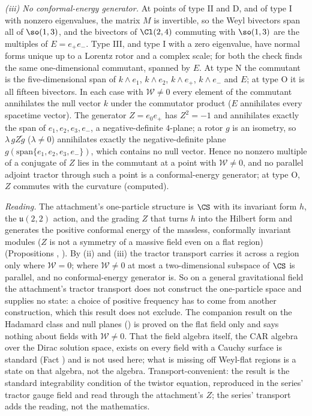 \emph{(iii) No conformal-energy generator.} At points of type II and D, and of type I with nonzero eigenvalues, the matrix $M$ is invertible, so the Weyl bivectors span all of $\so(1,3)$, and the bivectors of $\Cl(2,4)$ commuting with $\so(1,3)$ are the multiples of $E = e_{+}e_{-}$. Type III, and type I with a zero eigenvalue, have normal forms unique up to a Lorentz rotor and a complex scale; for both the check finds the same one-dimensional commutant, spanned by $E$. At type N the commutant is the five-dimensional span of $k\wedge e_{1}$, $k\wedge e_{2}$, $k\wedge e_{+}$, $k\wedge e_{-}$ and $E$; at type O it is all fifteen bivectors. In each case with $\mathcal{W} \neq 0$ every element of the commutant annihilates the null vector $k$ under the commutator product ($E$ annihilates every spacetime vector). The generator $Z = e_{0}e_{+}$ has $Z^{2} = -1$ and annihilates exactly the span of $e_{1}, e_{2}, e_{3}, e_{-}$, a negative-definite $4$-plane; a rotor $g$ is an isometry, so $\lambda\,gZ\tilde g$ ($\lambda \neq 0$) annihilates exactly the negative-definite plane $g(\mathrm{span}\{e_{1}, e_{2}, e_{3}, e_{-}\})$, which contains no null vector. Hence no nonzero multiple of a conjugate of $Z$ lies in the commutant at a point with $\mathcal{W} \neq 0$, and no parallel adjoint tractor through such a point is a conformal-energy generator; at type O, $Z$ commutes with the curvature (computed).

\emph{Reading.} The attachment's one-particle structure is $\CS$ with its invariant form $h$, the $\mathfrak{u}(2,2)$ action, and the grading $Z$ that turns $h$ into the Hilbert form and generates the positive conformal energy of the massless, conformally invariant modules ($Z$ is not a symmetry of a massive field even on a flat region) (Propositions , ). By (ii) and (iii) the tractor transport carries it across a region only where $\mathcal{W} = 0$; where $\mathcal{W} \neq 0$ at most a two-dimensional subspace of $\CS$ is parallel, and no conformal-energy generator is. So on a general gravitational field the attachment's tractor transport does not construct the one-particle space and supplies no state: a choice of positive frequency has to come from another construction, which this result does not exclude. The companion result on the Hadamard class and null planes () is proved on the flat field only and says nothing about fields with $\mathcal{W} \neq 0$. That the field algebra itself, the CAR algebra over the Dirac solution space, exists on every field with a Cauchy surface is standard (Fact ) and is not used here; what is missing off Weyl-flat regions is a state on that algebra, not the algebra. Transport-convenient: the result is the standard integrability condition of the twistor equation, reproduced in the series' tractor gauge field and read through the attachment's $Z$; the series' transport adds the reading, not the mathematics.
